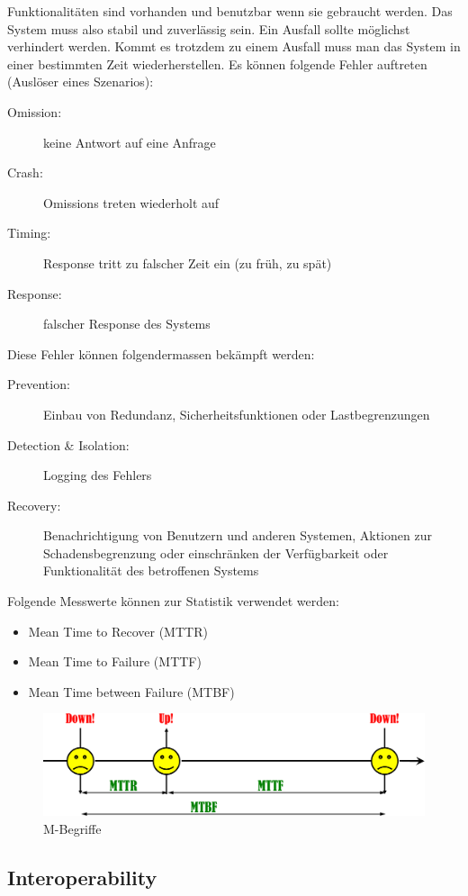 Funktionalitäten sind vorhanden und benutzbar wenn sie gebraucht werden. Das System muss also stabil und zuverlässig sein. Ein Ausfall sollte möglichst verhindert werden. Kommt es trotzdem zu einem Ausfall muss man das System in einer bestimmten Zeit wiederherstellen. Es können folgende Fehler auftreten (Auslöser eines Szenarios):
\begin{description}
	\item[Omission:] keine Antwort auf eine Anfrage
	\item[Crash:] Omissions treten wiederholt auf
	\item[Timing:] Response tritt zu falscher Zeit ein (zu früh, zu spät)
	\item[Response:] falscher Response des Systems
\end{description}
Diese Fehler können folgendermassen bekämpft werden:
\begin{description}
	\item[Prevention:] Einbau von Redundanz, Sicherheitsfunktionen oder Lastbegrenzungen
	\item[Detection \& Isolation:] Logging des Fehlers
	\item[Recovery:] Benachrichtigung von Benutzern und anderen Systemen, Aktionen zur Schadensbegrenzung oder einschränken der Verfügbarkeit oder Funktionalität des betroffenen Systems
\end{description}
Folgende Messwerte können zur Statistik verwendet werden:
\begin{itemize}
	\item Mean Time to Recover (MTTR)
	\item Mean Time to Failure (MTTF)
	\item Mean Time between Failure (MTBF)
\end{itemize}
\begin{figure}[h!]
\centering
\includegraphics[width=\linewidth]{fig/mbegriffe}
\caption{M-Begriffe}
\label{fig:mbegriffe}
\end{figure}

\subsection{Interoperability}

